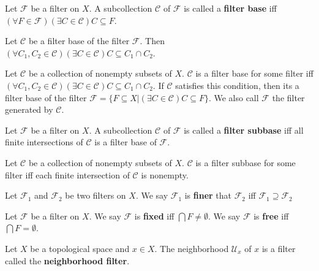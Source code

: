 \documentclass[12pt]{book}
\begin{document}
\begin{definition}
	Let $\mathcal F$ be a filter on $X$. A subcollection $\mathcal C$ of $\mathcal F$ is called a {\bf filter base} iff $(\forall F\in\mathcal F)(\exists C\in \mathcal C) C\subseteq F$.
\end{definition}

\begin{lemma}
	Let $\mathcal C$ be a filter base of the filter $\mathcal F$. Then $(\forall C_1,C_2\in \mathcal C)(\exists C\in \mathcal C)C\subseteq C_1\cap C_2$.
\end{lemma}

\begin{lemma}
	Let $\mathcal C$ be a collection of nonempty subsets of $X$. $\mathcal C$ is a filter base for some filter iff $(\forall C_1,C_2\in \mathcal C)(\exists C\in \mathcal C)C\subseteq C_1\cap C_2$. If $\mathcal C$ satisfies this condition, then its a filter base of the filter $\mathcal F=\{F\subseteq X|(\exists C\in \mathcal C)C\subseteq F\}$. We also call $\mathcal F$ the filter generated by $\mathcal C$.
\end{lemma}


\begin{definition}
	Let $\mathcal F$ be a filter on $X$. A subcollection $\mathcal C$ of $\mathcal F$ is called a {\bf filter subbase} iff all finite intersections of $\mathcal C$ is a filter base of $\mathcal F$.
\end{definition}

\begin{lemma}
	Let $\mathcal C$ be a collection of nonempty subsets of $X$. $\mathcal C$ is a filter subbase for some filter iff each finite intersection of $\mathcal C$ is nonempty.
\end{lemma}

\begin{definition}
	Let $\mathcal F_1$ and $\mathcal F_2$ be two filters on $X$. We say $\mathcal F_1$ is {\bf finer} that $\mathcal F_2$ iff $\mathcal F_1\supseteq\mathcal F_2$
\end{definition}

\begin{definition}
	Let $\mathcal F$ be a filter on $X$. We say $\mathcal F$ is {\bf fixed} iff $\bigcap F\neq\emptyset$. We say $\mathcal F$ is {\bf free} iff $\bigcap F=\emptyset$.
\end{definition}

\begin{example}
	Let $X$ be a topological space and $x\in X$. The neighborhood $\mathcal U_x$ of $x$ is a filter called the {\bf neighborhood filter}.
\end{example}
\end{document}
